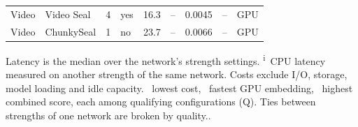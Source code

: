 \begin{table}[!t]
\begin{tabular}{llrlrrrrl}
Video & Video Seal & 4 & yes & 16.3 & -- & 0.0045 & -- & GPU \\
Video & ChunkySeal & 1 & no & 23.7 & -- & 0.0066 & -- & GPU \\
\bottomrule
\end{tabular}
\par\vspace{2pt}\parbox{\linewidth}{\raggedright\scriptsize Latency is the median over the network's strength settings. \textsuperscript{i}~CPU latency measured on another strength of the same network. Costs exclude I/O, storage, model loading and idle capacity. \costmark\ lowest cost, \speedmark\ fastest GPU embedding, \bestmark\ highest combined score, each among qualifying configurations (Q). Ties between strengths of one network are broken by quality..}
\end{table}
